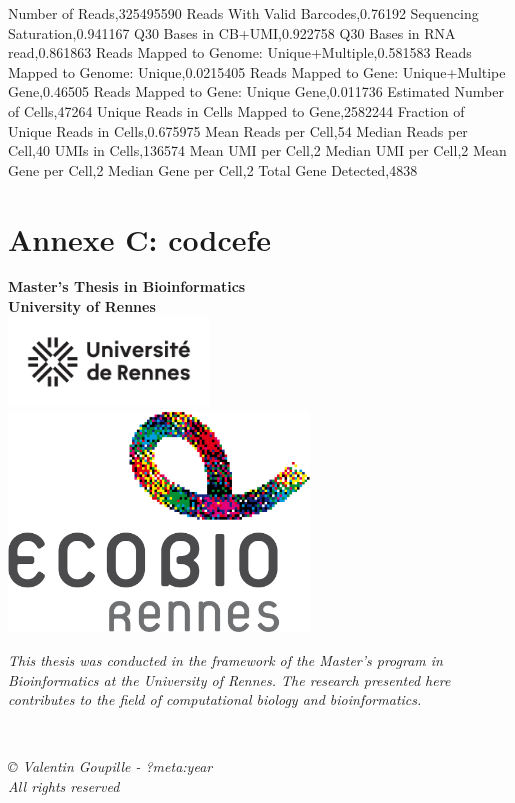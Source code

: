 \documentclass[
  11pt,
  a4paper,
]{report}
\begin{document}
Number of Reads,325495590 Reads With Valid Barcodes,0.76192 Sequencing
Saturation,0.941167 Q30 Bases in CB+UMI,0.922758 Q30 Bases in RNA
read,0.861863 Reads Mapped to Genome: Unique+Multiple,0.581583 Reads
Mapped to Genome: Unique,0.0215405 Reads Mapped to Gene: Unique+Multipe
Gene,0.46505 Reads Mapped to Gene: Unique Gene,0.011736 Estimated Number
of Cells,47264 Unique Reads in Cells Mapped to Gene,2582244 Fraction of
Unique Reads in Cells,0.675975 Mean Reads per Cell,54 Median Reads per
Cell,40 UMIs in Cells,136574 Mean UMI per Cell,2 Median UMI per Cell,2
Mean Gene per Cell,2 Median Gene per Cell,2 Total Gene Detected,4838

\chapter{Annexe C: codcefe}\label{annexe-c}

\clearpage
\thispagestyle{empty}
\vspace*{\fill}
\vspace*{\fill}
\clearpage



\newpage  %
\thispagestyle{empty}  %
\begin{center}
  {\Huge \textbf{Master's Thesis in Bioinformatics}} \\[2cm]
  {\Large \textbf{University of Rennes}} \\[1cm]
  \includegraphics[width=0.4\textwidth]{figures/rapport/logo_Univ_Rennes.png} \\[1cm]
  \includegraphics[width=0.6\textwidth]{figures/rapport/couverture.png} \\[1cm]
  \begin{minipage}{0.8\textwidth}
    \centering
    \textit{This thesis was conducted in the framework of the Master's program in Bioinformatics at the University of Rennes. The research presented here contributes to the field of computational biology and bioinformatics.}
  \end{minipage} \\[1cm]
  \begin{minipage}{0.8\textwidth}
    \centering
    \small
    \textit{© Valentin Goupille - ?meta:year \\ All rights reserved}
  \end{minipage}
\end{center} 
\end{document}
